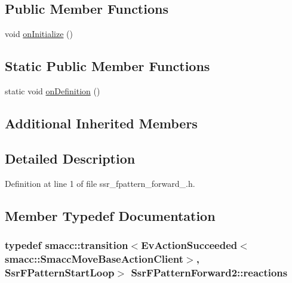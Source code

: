 \subsection*{Public Member Functions}
\begin{DoxyCompactItemize}
\item 
void \hyperlink{structSsrFPatternForward2_a81c19ada428b305cef1e21f39a090fa8}{on\+Initialize} ()
\end{DoxyCompactItemize}
\subsection*{Static Public Member Functions}
\begin{DoxyCompactItemize}
\item 
static void \hyperlink{structSsrFPatternForward2_a631add10c8ff5c96d45d54bdc5d918fc}{on\+Definition} ()
\end{DoxyCompactItemize}
\subsection*{Additional Inherited Members}


\subsection{Detailed Description}


Definition at line 1 of file ssr\+\_\+fpattern\+\_\+forward\+\_.\+h.



\subsection{Member Typedef Documentation}
\subsubsection[{\texorpdfstring{reactions}{reactions}}]{\setlength{\rightskip}{0pt plus 5cm}typedef {\bf smacc\+::transition}$<$Ev\+Action\+Succeeded$<${\bf smacc\+::\+Smacc\+Move\+Base\+Action\+Client}$>$, {\bf Ssr\+F\+Pattern\+Start\+Loop}$>$ {\bf Ssr\+F\+Pattern\+Forward2\+::reactions}}\hypertarget{structSsrFPatternForward2_a99e7488097a68de736567e9f7da6d77f}{}\label{structSsrFPatternForward2_a99e7488097a68de736567e9f7da6d77f}


